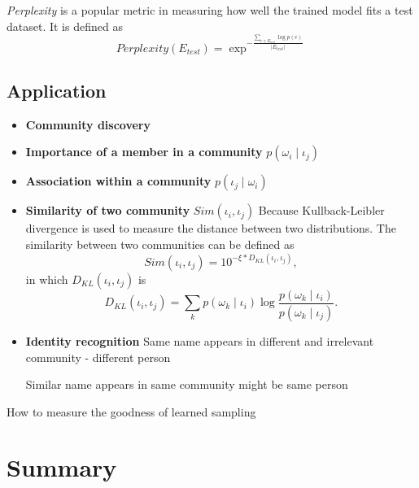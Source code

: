 \documentclass[letterpaper]{article}
\begin{document}
\emph{Perplexity} is a popular metric in measuring how well the trained model fits a test dataset.
It is defined as 
\begin{equation}
Perplexity( E_{test} ) = \exp^{- \frac{ \sum_{e \in E_{test}} \log p(e) }{ | E_{test} | } }
\end{equation}

\subsection{Application}

\begin{itemize}
\item \textbf{Community discovery} 
\item \textbf{Importance of a member in a community} $ p ( \omega_{i}  \mid \iota_{j} ) $ 
\item \textbf{Association within a community} $ p ( \iota_{j} \mid \omega_{i} ) $
\item \textbf{Similarity of two community} $ Sim ( \iota_{i}, \iota_{j} ) $
Because Kullback-Leibler divergence is used to measure the distance between two distributions.
The similarity between two communities can be defined as 
\begin{equation}
Sim ( \iota_{i}, \iota_{j} ) = 10^{ - \xi \ast D_{KL} ( \iota_{i}, \iota_{j} ) },
\end{equation}
in which $ D_{KL} ( \iota_{i}, \iota_{j} ) $ is
\begin{equation}
D_{KL} ( \iota_{i}, \iota_{j} ) = \sum_{k} p( \omega_{k} \mid \iota_{i} ) \log \frac{ p( \omega_{k} \mid \iota_{i} ) }{ p( \omega_{k} \mid \iota_{j} ) }.
\end{equation}
\end{itemize}

\begin{itemize}
\item \textbf{Identity recognition}
Same name appears in different and irrelevant community - different person

Similar name appears in same community might be same person
\end{itemize}


How to measure the goodness of learned sampling

\section{Summary}



\end{document}
